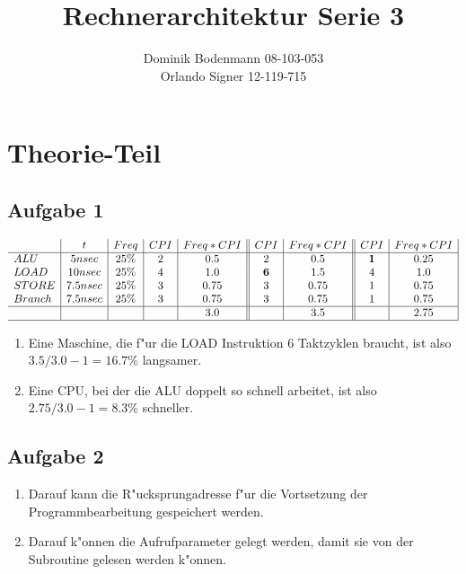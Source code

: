 \documentclass[a4paper,abstracton]{scrartcl}
\title{Rechnerarchitektur Serie 3}
\author{Dominik Bodenmann 08-103-053\\
	Orlando Signer 12-119-715\\}
\begin{document}
\maketitle

\section{Theorie-Teil}
\subsection{Aufgabe 1}
$
\begin{array}{l|c|c|c|c||c|c||c|c|}
 & t & Freq & CPI & Freq*CPI & CPI & Freq*CPI & CPI & Freq*CPI\\
\hline
ALU & 5nsec & 25\% & 2 & 0.5 & 2 & 0.5 & {\bf 1} & 0.25\\
LOAD & 10nsec & 25\% & 4 & 1.0 & {\bf 6} & 1.5 & 4 & 1.0\\
STORE & 7.5nsec & 25\% & 3 & 0.75 & 3 & 0.75 & 1 & 0.75\\
Branch & 7.5nsec & 25\% & 3 & 0.75 & 3 & 0.75 & 1 & 0.75\\
\hline
 & & & & 3.0 & & 3.5 & & 2.75\\
\hline\end{array}
$
\\
\begin{enumerate}
	\item Eine Maschine, die f"ur die LOAD Instruktion 6 Taktzyklen braucht, ist also\\$ 3.5/3.0 - 1 = 16.7\% $ langsamer.
	\item Eine CPU, bei der die ALU doppelt so schnell arbeitet, ist also\\$ 2.75/3.0 -1 = 8.3\% $ schneller.
\end{enumerate}

\subsection{Aufgabe 2}
\begin{enumerate}
	\item Darauf kann die R"ucksprungadresse f"ur die Vortsetzung der Programmbearbeitung gespeichert werden.
	\item Darauf k"onnen die Aufrufparameter gelegt werden, damit sie von der Subroutine gelesen werden k"onnen.
\end{enumerate}
\newpage
\end{document}

